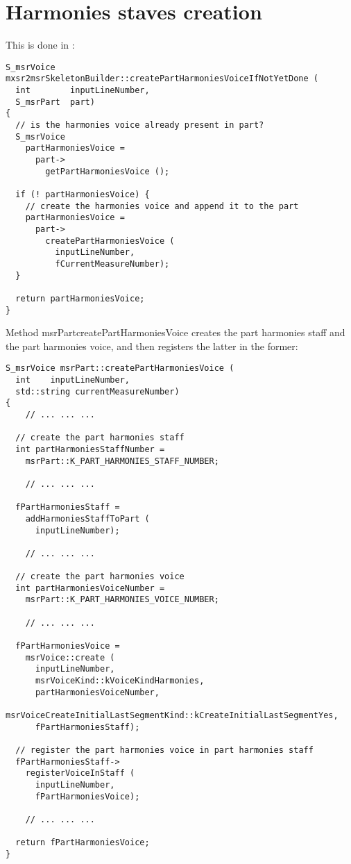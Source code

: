 \section{Harmonies staves creation}

This is done in :
\begin{lstlisting}[language=CPlusPlus]
S_msrVoice mxsr2msrSkeletonBuilder::createPartHarmoniesVoiceIfNotYetDone (
  int        inputLineNumber,
  S_msrPart  part)
{
  // is the harmonies voice already present in part?
  S_msrVoice
    partHarmoniesVoice =
      part->
        getPartHarmoniesVoice ();

  if (! partHarmoniesVoice) {
    // create the harmonies voice and append it to the part
    partHarmoniesVoice =
      part->
        createPartHarmoniesVoice (
          inputLineNumber,
          fCurrentMeasureNumber);
  }

  return partHarmoniesVoice;
}
\end{lstlisting}

Method {msrPart}{createPartHarmoniesVoice} creates the part harmonies staff and the part harmonies voice, and then registers the latter in the former:
\begin{lstlisting}[language=CPlusPlus]
S_msrVoice msrPart::createPartHarmoniesVoice (
  int    inputLineNumber,
  std::string currentMeasureNumber)
{
	// ... ... ...

  // create the part harmonies staff
  int partHarmoniesStaffNumber =
    msrPart::K_PART_HARMONIES_STAFF_NUMBER;

	// ... ... ...

  fPartHarmoniesStaff =
    addHarmoniesStaffToPart (
      inputLineNumber);

	// ... ... ...

  // create the part harmonies voice
  int partHarmoniesVoiceNumber =
    msrPart::K_PART_HARMONIES_VOICE_NUMBER;

	// ... ... ...

  fPartHarmoniesVoice =
    msrVoice::create (
      inputLineNumber,
      msrVoiceKind::kVoiceKindHarmonies,
      partHarmoniesVoiceNumber,
      msrVoiceCreateInitialLastSegmentKind::kCreateInitialLastSegmentYes,
      fPartHarmoniesStaff);

  // register the part harmonies voice in part harmonies staff
  fPartHarmoniesStaff->
    registerVoiceInStaff (
      inputLineNumber,
      fPartHarmoniesVoice);

	// ... ... ...

  return fPartHarmoniesVoice;
}
\end{lstlisting}


